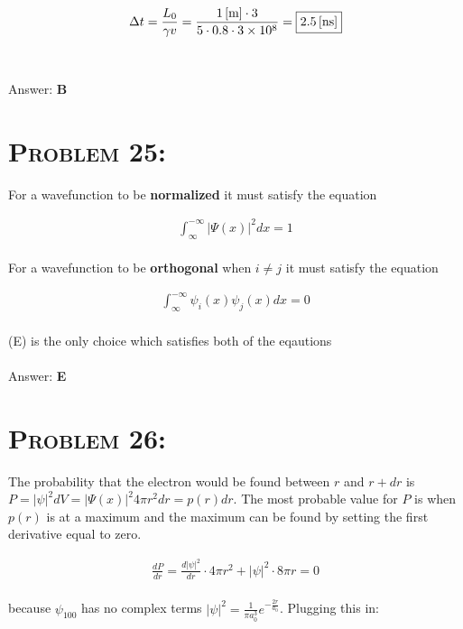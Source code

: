 \documentclass{article}
\providecommand{\e}[1]{\ensuremath{\times 10^{#1}}}
\begin{document}
\begin {align}
\Delta t = \frac{L_{0}}{\gamma v} = \frac{\unit[1]{[m]} \cdot 3}{5 \cdot 0.8 \cdot 3\e{8}} = \boxed{\unit[2.5]{[ns]}}\nonumber
\end{align}
\\\\
Answer: \textbf{\textcolor{ProcessBlue}B}\\


\section{\textsc{Problem 25:}} For a wavefunction to be  \textbf{normalized} it must satisfy the equation

\begin{align}
\int_{\infty}^{-\infty} |\Psi (x)| ^{2} dx = 1
\end{align}
\\
For a wavefunction to be \textbf{orthogonal} when $i \neq j$ it must satisfy the equation

\begin{align}
\int_{\infty}^{-\infty} \psi_{i} (x) \psi_{j} (x)  dx = 0
\end{align}
\\
(E) is the only choice which satisfies both of the eqautions
\\\\
Answer: \textbf{\textcolor{ProcessBlue}E}\\


\section{\textsc{Problem 26:}} The probability that the electron would be found between $r$ and $r+dr$ is $P = |\psi |^{2} dV = |\Psi (x) |^{2} 4 \pi r^{2} dr = p(r)dr$. The most probable value for $P$ is when $p(r)$ is at a maximum and the maximum can be found by setting the first derivative equal to zero.

\begin{align}
\frac{dP}{dr} = \frac{d|\psi |^{2}}{dr} \cdot 4 \pi r^2 + |\psi |^{2} \cdot 8 \pi r = 0
\end{align}
\\
because $\psi_{100}$ has no complex terms $|\psi |^{2} = \frac{1}{\pi a_{0}^3} e^{-\frac{2 r}{a_{0}}}$. Plugging  this in:
\end{document}
